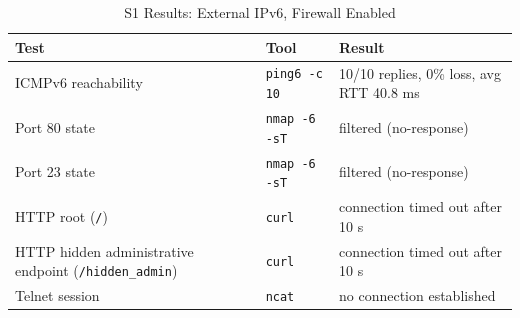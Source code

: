 \begin{table}[H]
    \centering
    \caption{S1 Results: External IPv6, Firewall Enabled}
    \label{tab:s1-external-ipv6-fw-enabled-results}
    \begin{tabularx}{\textwidth}{p{} p{} L}
        \toprule
        \textbf{\color{white}Test} & \textbf{\color{white}Tool} & \textbf{\color{white}Result} \\
        \midrule
        ICMPv6 reachability & \texttt{ping6 -c 10} & 10/10 replies, 0\% loss, avg RTT 40.8 ms \\
        Port 80 state & \texttt{nmap -6 -sT} & filtered (no-response) \\
        Port 23 state & \texttt{nmap -6 -sT} & filtered (no-response) \\
        HTTP root (\texttt{/}) & \texttt{curl} & connection timed out after 10 s \\
        HTTP hidden administrative endpoint (\texttt{/hidden\_admin}) & \texttt{curl} & connection timed out after 10 s \\
        Telnet session & \texttt{ncat} & no connection established \\
        \bottomrule
    \end{tabularx}
\end{table}
